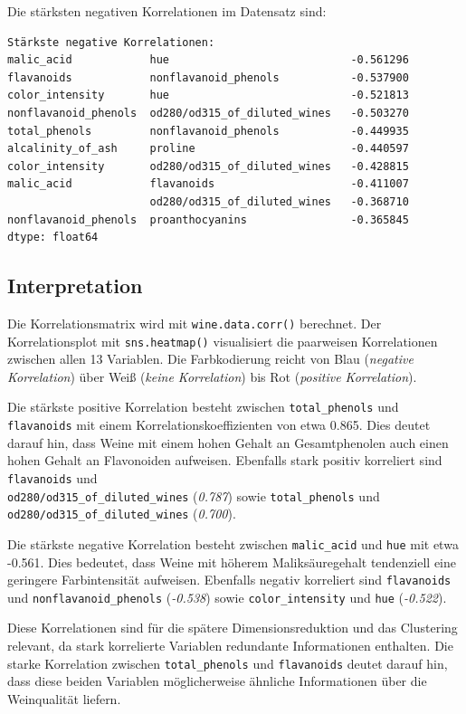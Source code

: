 Die stärksten negativen Korrelationen im Datensatz sind:

\begin{verbatim}
Stärkste negative Korrelationen:
malic_acid            hue                            -0.561296
flavanoids            nonflavanoid_phenols           -0.537900
color_intensity       hue                            -0.521813
nonflavanoid_phenols  od280/od315_of_diluted_wines   -0.503270
total_phenols         nonflavanoid_phenols           -0.449935
alcalinity_of_ash     proline                        -0.440597
color_intensity       od280/od315_of_diluted_wines   -0.428815
malic_acid            flavanoids                     -0.411007
                      od280/od315_of_diluted_wines   -0.368710
nonflavanoid_phenols  proanthocyanins                -0.365845
dtype: float64
\end{verbatim}

\subsection{Interpretation}

Die Korrelationsmatrix wird mit \texttt{wine.data.corr()} berechnet. Der Korrelationsplot mit \texttt{sns.heatmap()} visualisiert die paarweisen Korrelationen zwischen allen 13 Variablen. Die Farbkodierung reicht von Blau (\textit{negative Korrelation}) über Weiß (\textit{keine Korrelation}) bis Rot (\textit{positive Korrelation}).

Die stärkste positive Korrelation besteht zwischen \texttt{total\_phenols} und \texttt{flavanoids} mit einem Korrelationskoeffizienten von etwa 0.865. Dies deutet darauf hin, dass Weine mit einem hohen Gehalt an Gesamtphenolen auch einen hohen Gehalt an Flavonoiden aufweisen. Ebenfalls stark positiv korreliert sind \texttt{flavanoids} und \\ \texttt{od280/od315\_of\_diluted\_wines} (\textit{0.787}) sowie \texttt{total\_phenols} und \texttt{od280/od315\_of\_diluted\_wines} (\textit{0.700}).

Die stärkste negative Korrelation besteht zwischen \texttt{malic\_acid} und \texttt{hue} mit etwa -0.561. Dies bedeutet, dass Weine mit höherem Maliksäuregehalt tendenziell eine geringere Farbintensität aufweisen. Ebenfalls negativ korreliert sind \texttt{flavanoids} und \texttt{nonflavanoid\_phenols} (\textit{-0.538}) sowie \texttt{color\_intensity} und \texttt{hue} (\textit{-0.522}).

Diese Korrelationen sind für die spätere Dimensionsreduktion und das Clustering relevant, da stark korrelierte Variablen redundante Informationen enthalten. Die starke Korrelation zwischen \texttt{total\_phenols} und \texttt{flavanoids} deutet darauf hin, dass diese beiden Variablen möglicherweise ähnliche Informationen über die Weinqualität liefern.

